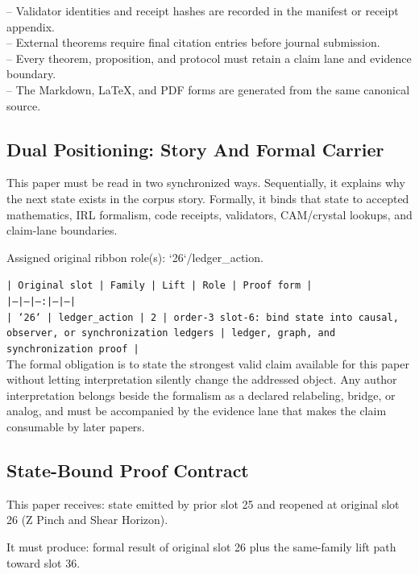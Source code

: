 \documentclass[11pt]{article}
\begin{document}
\noindent{}-- Validator identities and receipt hashes are recorded in the manifest or receipt appendix.\\
\noindent{}-- External theorems require final citation entries before journal submission.\\
\noindent{}-- Every theorem, proposition, and protocol must retain a claim lane and evidence boundary.\\
\noindent{}-- The Markdown, LaTeX, and PDF forms are generated from the same canonical source.\\

\subsection*{Dual Positioning: Story And Formal Carrier}

This paper must be read in two synchronized ways. Sequentially, it explains why
the next state exists in the corpus story. Formally, it binds that state to
accepted mathematics, IRL formalism, code receipts, validators, CAM/crystal
lookups, and claim-lane boundaries.

Assigned original ribbon role(s): `26`/ledger\_action.

\noindent\texttt{| Original slot | Family | Lift | Role | Proof form |}\\
\noindent\texttt{|---|---|---:|---|---|}\\
\noindent\texttt{| `26` | ledger\_action | 2 | order-3 slot-6: bind state into causal, observer, or synchronization ledgers | ledger, graph, and synchronization proof |}\\

The formal obligation is to state the strongest valid claim available for this
paper without letting interpretation silently change the addressed object. Any
author interpretation belongs beside the formalism as a declared relabeling,
bridge, or analog, and must be accompanied by the evidence lane that makes the
claim consumable by later papers.

\subsection*{State-Bound Proof Contract}

This paper receives: state emitted by prior slot 25 and reopened at original slot 26 (Z Pinch and Shear Horizon).

It must produce: formal result of original slot 26 plus the same-family lift path toward slot 36.
\end{document}
